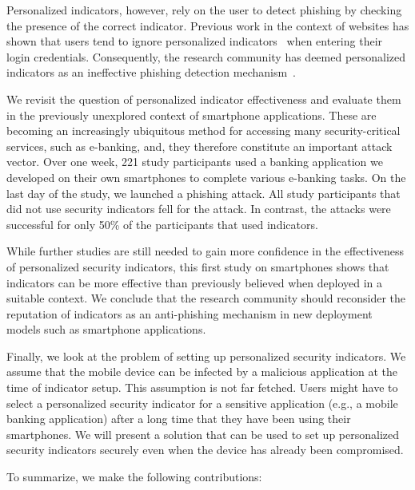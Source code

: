 Personalized indicators, however, rely on the user to detect phishing by checking the presence of the correct indicator.
Previous work in the context of websites has shown that users tend to ignore personalized indicators~\cite{schechter07sp,lee-w2sp14} when entering their login credentials.
Consequently, the research community has deemed personalized indicators as an ineffective phishing detection mechanism~\cite{bravolillo11sp,hong12cacm}.

We revisit the question of personalized indicator effectiveness and evaluate them in the previously unexplored context of smartphone applications. These are becoming an increasingly ubiquitous method for accessing many security-critical services, such as e-banking, and, they therefore constitute an important attack vector.
Over one week, 221 study participants used a banking application we developed on their own smartphones to complete various e-banking tasks. 
On the last day of the study, we launched a phishing attack.
All study participants that did not use security indicators fell for the attack.
In contrast, the attacks were successful for only 50\% of the participants that used indicators.

While further studies are still needed to gain more confidence in the effectiveness of personalized security indicators, this first study on smartphones shows that indicators can be more effective than
previously believed when deployed in a suitable context. We conclude
that the research community should reconsider the reputation of indicators as an anti-phishing mechanism in new deployment models such as smartphone applications.

Finally, we look at the problem of setting up personalized security indicators. We assume that the mobile device can be infected by a malicious application at the time of indicator setup. This assumption is not far fetched. Users might have to select a personalized security indicator for a sensitive application (e.g., a mobile banking application) after a long time that they have been using their smartphones. We will present a solution that can be used to set up personalized security indicators securely even when the device has already been compromised. 

To summarize, we make the following contributions:

